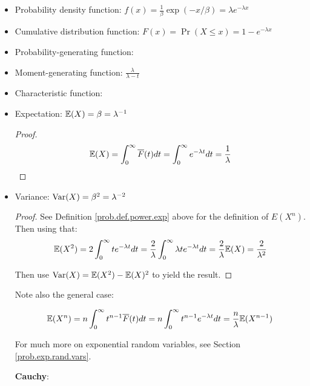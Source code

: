 \begin{itemize}

\item Probability density function: \(f(x) = \frac{1}{\beta} \exp(-x/\beta) = \lambda e^{- \lambda x} \)

\item Cumulative distribution function: \(F(x) = \Pr(X \leq x) = 1 - e^{-\lambda x}\)

\item Probability-generating function:

\item Moment-generating function: \(\frac{\lambda}{\lambda - t}\)

\item Characteristic function:

\item Expectation: \(\E(X) = \beta = \lambda^{-1} \)

\begin{proof}

\[
 \E(X) = \int_0^\infty \overline{F}(t)dt = \int_0^\infty e^{-\lambda t} dt = \frac{1}{\lambda}
 \]

\end{proof}

\item Variance: \(\Var(X) = \beta^2 = \lambda^{-2}  \)

\begin{proof} See Definition \ref{prob.def.power.exp} above for the definition of \(E(X^n)\). Then using that:
\[
\E(X^2) = 2 \int_0^\infty t e^{-\lambda t} dt = \frac{2}{\lambda} \int_0^\infty \lambda t e^{-\lambda t} dt = \frac{2}{\lambda} \E(X) = \frac{2}{\lambda^2}
\]

Then use \(\Var(X) = \E(X^2) - \E(X)^2\) to yield the result. 
\end{proof}

\begin{remark} Note also the general case:

\[
\E(X^n) = n \int_0^\infty t^{n-1} \overline{F}(t) dt = n \int_0^\infty t^{n-1} e^{-\lambda t} dt = \frac{n}{\lambda} \E(X^{n-1})
\]

\end{remark}

For much more on exponential random variables, see Section \ref{prob.exp.rand.vars}.

\textbf{Cauchy}: 

\begin{itemize}


\end{itemize}
\end{itemize}
